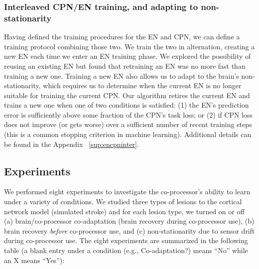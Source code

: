 \documentclass[12pt]{iopart}
\begin{document}
\subsubsection{Interleaved CPN/EN training, and adapting to non-stationarity}
\label{sec:interleaving}
Having defined the training procedures for the EN and CPN, we can define a training
protocol combining those two. We train the two in alternation, creating
a new EN each time we enter an EN training phase. We explored the possibility
of reusing an existing EN but found that retraining an EN was no more fast than training a new one.
Training a new EN also allows us to adapt to the brain's non-stationarity, which requires us to
determine when the current EN is no longer suitable for training the current CPN. 
Our algorithm retires the current EN and trains a new one when one of two conditions
is satisfied: (1) the EN's prediction error is sufficiently above some fraction of the CPN's task loss;
or (2) if CPN loss does not improve (or gets worse) over a sufficient number of recent training steps 
(this is a common stopping criterion in machine learning). Additional details can be found in the
Appendix ~\ref{sup:encpninter}.

\subsection{Experiments}
\label{sec:experiments}

We performed eight experiments to investigate the co-processor's ability to learn under a variety of
conditions. We studied three types of lesions to the cortical network model (simulated stroke) and for
each lesion type, we turned on or off (a) brain/co-processor co-adaptation (brain recovery during
co-processor use), (b) brain recovery {\em before} co-processor use, and (c) non-stationarity due to
sensor drift during co-processor use. The eight experiments are summarized in the following table 
(a blank entry under a condition (e.g., Co-adaptation?) means ``No'' while an X means ``Yes''): \\
\end{document}
